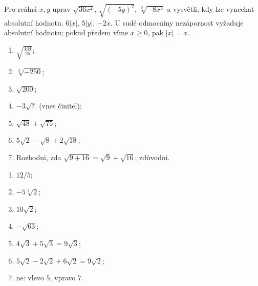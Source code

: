 \documentclass[11pt,a4paper]{article}
\begin{document}
\begin{prikladReseniBox}[title={Rozšíření 1},breakable=false]
Pro reálná $x,y$ uprav $\sqrt{36x^2}$, $\sqrt{(-5y)^2}$,
$\sqrt[3]{-8x^3}$ a vysvětli, kdy lze vynechat absolutní hodnotu.
\tcblower
$6|x|$, $5|y|$, $-2x$. U sudé odmocniny nezápornost vyžaduje
absolutní hodnotu; pokud předem víme $x\ge0$, pak $|x|=x$.
\end{prikladReseniBox}

\begin{zadaniReseniBox}[title={Domácí úkol},breakable=false]
\begin{enumerate}[label=\alph*)]
\item $\sqrt{\frac{144}{25}}$; \item $\sqrt[3]{-250}$;
\item $\sqrt{200}$; \item $-3\sqrt7$ (vnes činitel);
\item $\sqrt{48}+\sqrt{75}$;
\item $5\sqrt2-\sqrt8+2\sqrt{18}$;
\item Rozhodni, zda $\sqrt{9+16}=\sqrt9+\sqrt{16}$; zdůvodni.
\end{enumerate}
\tcblower
\begin{enumerate}[label=\alph*)]
\item $12/5$; \item $-5\sqrt[3]2$; \item $10\sqrt2$;
\item $-\sqrt{63}$; \item $4\sqrt3+5\sqrt3=9\sqrt3$;
\item $5\sqrt2-2\sqrt2+6\sqrt2=9\sqrt2$;
\item ne: vlevo $5$, vpravo $7$.
\end{enumerate}
\end{zadaniReseniBox}
\end{document}
